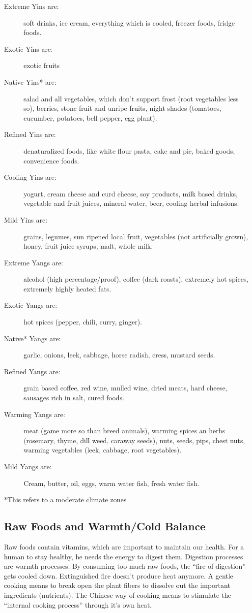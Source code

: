 \documentclass[../main.tex]{subfiles}
\begin{document}
\begin{description}
\item[Extreme Yins are:] soft drinks, ice cream, everything which is cooled, freezer foods, fridge foods.
\item[Exotic Yins are:] exotic fruits
\item[Native Yins* are:] salad and all vegetables, which don't support frost (root vegetables less so), berries, stone fruit
  and unripe fruits, night shades (tomatoes, cucumber, potatoes, bell pepper, egg plant).
\item[Refined Yins are:] denaturalized foods, like white flour pasta, cake and pie, baked goods, convenience foods.
\item[Cooling Yins are:] yogurt, cream cheese and curd cheese, soy products, milk based drinks, vegetable and fruit juices,
  mineral water, beer, cooling herbal infusions.
\item[Mild Yins are:] grains, legumes, sun ripened local fruit, vegetables (not artificially grown), honey,
  fruit juice syrups, malt, whole milk.
\item[Extreme Yangs are:] alcohol (high percentage/proof), coffee (dark roasts), extremely hot spices, extremely highly heated fats.
\item[Exotic Yangs are:] hot spices (pepper, chili, curry, ginger).
\item[Native* Yangs are:] garlic, onions, leek, cabbage, horse radish, cress, mustard seeds.
\item[Refined Yangs are:] grain based coffee, red wine, mulled wine, dried meats, hard cheese, sausages rich in salt, cured foods.
\item[Warming Yangs are:] meat (game more so than breed animals), warming spices an herbs
  (rosemary, thyme, dill weed, caraway seeds), nuts, seeds, pips, chest nuts, warming vegetables (leek, cabbage, root vegetables).
\item[Mild Yangs are:] Cream, butter, oil, eggs, warm water fish, fresh water fish.
\end{description}
\footnotesize{*This refers to a moderate climate zones}
\normalsize

\subsection{Raw Foods and Warmth/Cold Balance}

Raw foods contain vitamins, which are important to maintain our health.
For a human to stay healthy, he needs the energy to digest them.
Digestion processes are warmth processes.
By consuming too much raw foods, the ``fire of digestion'' gets cooled down.
Extinguished fire doesn't produce heat anymore.
A gentle cooking means to break open the plant fibers to dissolve out the important ingredients (nutrients).
The Chinese way of cooking means to stimulate the ``internal cooking process'' through it's own heat.
\end{document}
